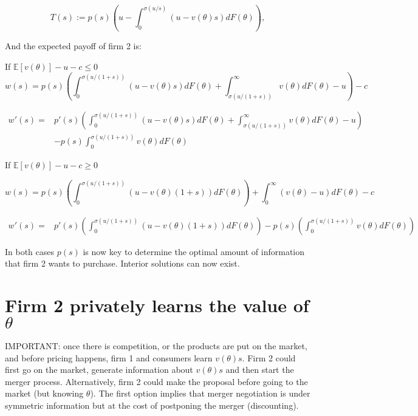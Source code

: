 \documentclass[a4paper,leqno]{article}%
\newcommand{\E}{\mathbb E}
\renewcommand{\t}{\theta}
\newcommand{\s}{\sigma}
\begin{document}
\[
T(s):=p(s)\left(u-\int_{0}^{\s(u/s)}(u-v(\t)s)dF(\t)\right),
\]

\medskip

And the expected payoff of firm 2 is:

If $\E[v(\t)]-u-c\leq 0$
%
\[
w(s)=p(s)\left(\int_0^{\s(u/(1+s))}(u-v(\t)s)dF(\t)+\int_{\s(u/(1+s))}^\infty v(\t)dF(\t)-u\right)-c
\]
%

\begin{equation}
    \begin{aligned}
w'(s)=&p'(s)\left(\int_0^{\s(u/(1+s))}(u-v(\t)s)dF(\t)+\int_{\s(u/(1+s))}^\infty v(\t)dF(\t)-u\right)\\
&-p(s)\int_0^{\s(u/(1+s))}v(\t)dF(\t)
\end{aligned}
\end{equation}


\medskip

If $\E[v(\t)]-u-c\geq 0$

\medskip

\[
w(s)=p(s)\left(\int_0^{\s(u/(1+s))}(u-v(\t)(1+s))dF(\t)\right)+\int_{0}^\infty (v(\t)-u)dF(\t)-c
\]

\begin{equation}
    \begin{aligned}
w'(s)=&p'(s)\left(\int_0^{\s(u/(1+s))}(u-v(\t)(1+s))dF(\t)\right)-p(s)\left(\int_{0}^{\s(u/(1+s))}v(\t)dF(\t)\right)
\end{aligned}
\end{equation}


\medskip

In both cases $p(s)$ is now key to determine the optimal amount of information that firm 2 wants to purchase. Interior solutions can now exist.


\medskip

\section{Firm 2 privately learns the value of $\t$}

IMPORTANT: once there is competition, or the products are put on the market, and before pricing happens, firm 1 and consumers learn $v(\t)s$. Firm 2 could first go on the market, generate information about $v(\t)s$ and then start the merger process. Alternatively, firm 2 could make the proposal before going to the market (but knowing $\t$). The first option implies that  merger negotiation is under symmetric information but at the cost of postponing the merger (discounting).
\end{document}
